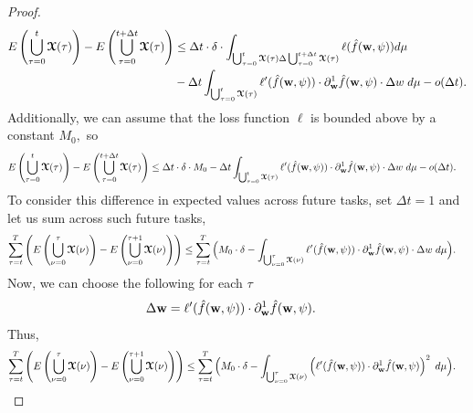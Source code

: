 \begin{proof}
    \begin{align*}
         E\left(\bigcup_{\tau = 0}^{t}\boldsymbol{\mathcal{X}}(\tau)\right) - E\left(\bigcup_{\tau = 0}^{t+\Delta t}\boldsymbol{\mathcal{X}}(\tau)\right)
         & \leq \Delta t \cdot \delta \cdot \displaystyle\int_{\bigcup_{\tau = 0}^{t}\boldsymbol{\mathcal{X}}(\tau)\Delta \bigcup_{\tau = 0}^{t+\Delta t}\boldsymbol{\mathcal{X}}(\tau)} \ell(\hat{f}(\boldsymbol{\mathrm{w}},\psi))d\mu\\
        & - \Delta t\displaystyle\int_{\bigcup_{\tau = 0}^{t}\boldsymbol{\mathcal{X}}(\tau)} \ell'(\hat{f}(\boldsymbol{\mathrm{w}},\psi))\cdot \partial_{\boldsymbol{\mathrm{w}}}^1 \hat{f}(\boldsymbol{\mathrm{w}},\psi)\cdot \Delta w \hspace{1mm}  d\mu- o(\Delta t).
    \end{align*}
    Additionally, we can assume that the loss function $\ell$ is bounded above by a constant $M_0,$ so
    \begin{align*}
        E\left(\bigcup_{\tau = 0}^{t}\boldsymbol{\mathcal{X}}(\tau)\right) - E\left(\bigcup_{\tau = 0}^{t+\Delta t}\boldsymbol{\mathcal{X}}(\tau)\right)
        & \leq \Delta t \cdot \delta \cdot M_0- \Delta t\displaystyle\int_{\bigcup_{\tau = 0}^{t}\boldsymbol{\mathcal{X}}(\tau)} \ell'(\hat{f}(\boldsymbol{\mathrm{w}},\psi))\cdot \partial_{\boldsymbol{\mathrm{w}}}^1 \hat{f}(\boldsymbol{\mathrm{w}},\psi)\cdot \Delta w \hspace{1mm}  d\mu- o(\Delta t).
    \end{align*}
    To consider this difference in expected values across future tasks, set $\Delta t =1 $ and let us sum across such future tasks, 
    \begin{align*}
         \sum_{\tau = t}^{T} \left(E\left(\bigcup_{\nu = 0}^{\tau}\boldsymbol{\mathcal{X}}(\nu)\right) - E\left(\bigcup_{\nu = 0}^{\tau+1}\boldsymbol{\mathcal{X}}(\nu)\right)\right)
        & \leq \sum_{\tau =t}^{T} \Big( M_0\cdot \delta - \displaystyle\int_{\bigcup_{\nu = 0}^{\tau}\boldsymbol{\mathcal{X}}(\nu)} \ell'(\hat{f}(\boldsymbol{\mathrm{w}},\psi))\cdot \partial_{\boldsymbol{\mathrm{w}}}^1 \hat{f}(\boldsymbol{\mathrm{w}},\psi)\cdot \Delta w \hspace{1mm}  d\mu \Big).
    \end{align*}
    Now, we can choose the following for each $\tau$
    \begin{align*}
        \Delta \boldsymbol{\mathrm{w}} & =  \ell'(\hat{f}(\boldsymbol{\mathrm{w}},\psi))\cdot \partial_{\boldsymbol{\mathrm{w}}}^1 \hat{f}(\boldsymbol{\mathrm{w}},\psi).
    \end{align*}
    Thus,
    \begin{align*}
         \sum_{\tau = t}^{T} \left(E\left(\bigcup_{\nu = 0}^{\tau}\tx(\nu)\right) - E\left(\bigcup_{\nu = 0}^{\tau+1}\tx(\nu)\right)\right)
        & \leq \sum_{\tau =t}^{T} \Big( M_0\cdot \delta - \displaystyle\int_{\bigcup_{\nu = 0}^\tau\tx(\nu)} \left(\ell'(\hat{f}(\weight,\psi))\cdot \partial_{\weight}^1 \hat{f}(\weight,\psi)\right)^2 \hspace{1mm}  d\mu \Big).

\end{align*}
\end{proof}
